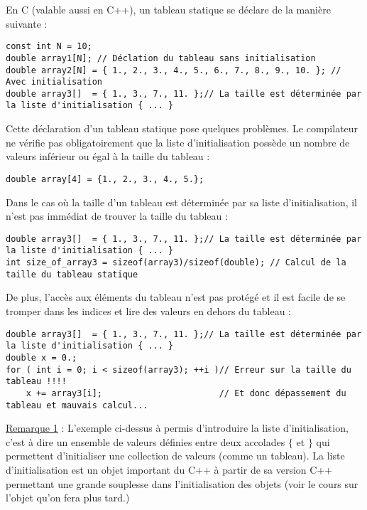 En C (valable aussi en C++), un tableau statique se déclare de la manière suivante :
\begin{lstlisting}[caption=Allocation statique d'un tableau en C/C++]
const int N = 10;
double array1[N]; // Déclation du tableau sans initialisation
double array2[N] = { 1., 2., 3., 4., 5., 6., 7., 8., 9., 10. }; // Avec initialisation
double array3[]  = { 1., 3., 7., 11. };// La taille est déterminée par la liste d'initialisation { ... }
\end{lstlisting}

Cette déclaration d'un tableau statique pose quelques problèmes. Le compilateur ne vérifie pas obligatoirement que la liste d'initialisation possède un nombre de valeurs inférieur ou égal à la taille du tableau :

\begin{lstlisting}
double array[4] = {1., 2., 3., 4., 5.};
\end{lstlisting}

Dans le cas où la taille d'un tableau est déterminée par sa liste d'initialisation, il n'est pas immédiat de trouver la taille du tableau :

\begin{lstlisting}[caption=lire la taille d'un tableau statique en C/C++]
double array3[]  = { 1., 3., 7., 11. };// La taille est déterminée par la liste d'initialisation { ... }
int size_of_array3 = sizeof(array3)/sizeof(double); // Calcul de la taille du tableau statique
\end{lstlisting}

De plus, l'accès aux éléments du tableau n'est pas protégé et il est facile de se tromper dans les indices et lire des valeurs en dehors du tableau :
\begin{lstlisting}[caption=Erreur d'indice]
double array3[]  = { 1., 3., 7., 11. };// La taille est déterminée par la liste d'initialisation { ... }
double x = 0.;
for ( int i = 0; i < sizeof(array3); ++i )// Erreur sur la taille du tableau !!!!
    x += array3[i];                       // Et donc dépassement du tableau et mauvais calcul...
\end{lstlisting}

\underline{Remarque 1} : L'exemple ci-dessus à permis d'introduire la liste d'initialisation, c'est à dire un ensemble de valeurs définies entre deux accolades $\{$ et $\}$ qui permettent d'initialiser une collection de valeurs (comme un tableau). La liste d'initialisation est un objet important du C++ à partir de sa version C++ permettant une grande souplesse dans l'initialisation des objets (voir le cours sur l'objet qu'on fera plus tard.)

